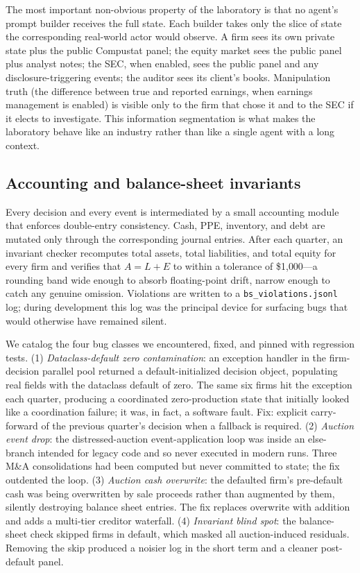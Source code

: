 \documentclass[11pt]{article}
\begin{document}
The most important non-obvious property of the laboratory is that no
agent's prompt builder receives the full state. Each builder takes only
the slice of state the corresponding real-world actor would observe. A
firm sees its own private state plus the public Compustat panel; the
equity market sees the public panel plus analyst notes; the SEC, when
enabled, sees the public panel and any disclosure-triggering events; the
auditor sees its client's books. Manipulation truth (the difference
between true and reported earnings, when earnings management is enabled)
is visible only to the firm that chose it and to the SEC if it elects to
investigate. This information segmentation is what makes the laboratory
behave like an industry rather than like a single agent with a long
context.

\subsection{Accounting and balance-sheet invariants}\label{sec:bsinvariants}

Every decision and every event is intermediated by a small accounting
module that enforces double-entry consistency. Cash, PPE, inventory, and
debt are mutated only through the corresponding journal entries. After
each quarter, an invariant checker recomputes total assets, total
liabilities, and total equity for every firm and verifies that
$A = L + E$ to within a tolerance of \$1{,}000---a rounding band wide
enough to absorb floating-point drift, narrow enough to catch any genuine
omission. Violations are written to a \texttt{bs\_violations.jsonl} log;
during development this log was the principal device for surfacing bugs
that would otherwise have remained silent.

We catalog the four bug classes we encountered, fixed, and pinned with
regression tests. (1) \emph{Dataclass-default zero contamination}: an
exception handler in the firm-decision parallel pool returned a
default-initialized decision object, populating real fields with the
dataclass default of zero. The same six firms hit the exception each
quarter, producing a coordinated zero-production state that initially
looked like a coordination failure; it was, in fact, a software fault.
Fix: explicit carry-forward of the previous quarter's decision when a
fallback is required. (2) \emph{Auction event drop}: the
distressed-auction event-application loop was inside an else-branch
intended for legacy code and so never executed in modern runs.
Three M\&A consolidations had been computed but never committed to
state; the fix outdented the loop. (3) \emph{Auction cash overwrite}: the
defaulted firm's pre-default cash was being overwritten by sale proceeds
rather than augmented by them, silently destroying balance sheet entries.
The fix replaces overwrite with addition and adds a multi-tier creditor
waterfall. (4) \emph{Invariant blind spot}: the balance-sheet check
skipped firms in default, which masked all auction-induced residuals.
Removing the skip produced a noisier log in the short term and a cleaner
post-default panel.
\end{document}
